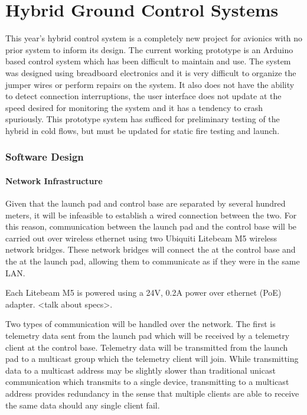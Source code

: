 \part{Hybrid Ground Control Systems}

This year's hybrid control system is a completely new project for avionics with no prior system to inform its design. The current working prototype is an Arduino based control system which has been difficult to maintain and use. The system was designed using breadboard electronics and it is very difficult to organize the jumper wires or perform repairs on the system. It also does not have the ability to detect connection interruptions, the user interface does not update at the speed desired for monitoring the system and it has a tendency to crash spuriously. This prototype system has sufficed for preliminary testing of the hybrid in cold flows, but must be updated for static fire testing and
launch.


\section{Software Design}

\subsection{Network Infrastructure}

Given that the launch pad and control base are separated by several hundred meters, it will be infeasible to establish 
a wired connection between the two. For this reason, communication between the launch pad and the control base will be
carried out over wireless ethernet using two Ubiquiti Litebeam M5 wireless network bridges. These network bridges will connect 
the  at the control base and the  at the launch pad, allowing them to communicate as if they 
were in the same LAN.

Each Litebeam M5 is powered using a 24V, 0.2A power over ethernet (PoE) adapter. <talk about specs>. 

Two types of communication will be handled over the network. The first is telemetry data sent from the launch pad which will be 
received by a telemetry client at the control base. Telemetry data will be transmitted from the launch pad to a 
multicast group which the telemetry client will join. While transmitting data to a  multicast address may be 
slightly slower than traditional  unicast communication which transmits to a single device, transmitting to a 
multicast address provides redundancy in the sense that multiple clients are able to receive the same data should any single client
fail.


